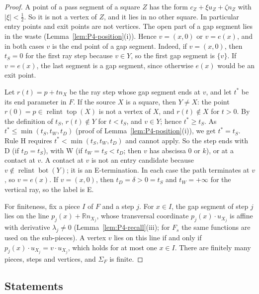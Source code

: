 \documentclass[11pt]{amsart}
\newcommand{\R}{\mathbb R}
\newcommand{\relint}{\operatorname{relint}}
\newcommand{\Bot}{\operatorname{bot}}
\newcommand{\Top}{\operatorname{top}}
\newcommand{\Fs}{F_{s}}
\theoremstyle{definition}
\theoremstyle{remark}
\numberwithin{equation}{section}
\begin{document}
\begin{proof}
A point of a pass segment of a square $Z$ has the form $c_Z+\xi u_Z+\zeta n_Z$ with $|\xi|<\frac12$. So it is not a vertex of $Z$, and it lies in no other square. In particular entry points and exit points are not vertices. The open part of a gap segment lies in the waste (Lemma~\ref{lem:P4-position}(i)). Hence $v=(x,0)$ or $v=e(x)$, and in both cases $v$ is the end point of a gap segment. Indeed, if $v=(x,0)$, then $t_S=0$ for the first ray step because $v\in Y$, so the first gap segment is $\{v\}$. If $v=e(x)$, the last segment is a gap segment, since otherwise $e(x)$ would be an exit point.

Let $r(t)=p+tn_X$ be the ray step whose gap segment ends at $v$, and let $t^*$ be its end parameter in $F$. If the source $X$ is a square, then $Y\ne X$: the point $r(0)=p\in\relint\Top(X)$ is not a vertex of $X$, and $r(t)\notin X$ for $t>0$. By the definition of $t_S$, $r(t)\notin Y$ for $t<t_S$, and $v\in Y$; hence $t^*\ge t_S$. As $t^*\le\min(t_S,t_W,t_D)$ (proof of Lemma~\ref{lem:P4-position}(i)), we get $t^*=t_S$. Rule H requires $t^*<\min(t_S,t_W,t_D)$ and cannot apply. So the step ends with D (if $t_D=t_S$), with W (if $t_W=t_S<t_D$; then $v$ has abscissa $0$ or $k$), or at a contact at $v$. A contact at $v$ is not an entry candidate because $v\notin\relint\Bot(Y)$; it is an E-termination. In each case the path terminates at $v$, so $v=e(x)$. If $v=(x,0)$, then $t_D=\delta>0=t_S$ and $t_W=+\infty$ for the vertical ray, so the label is E.

For finiteness, fix a piece $I$ of $F$ and a step $j$. For $x\in I$, the gap segment of step $j$ lies on the line $p_j(x)+\R n_{X_j}$, whose transversal coordinate $p_j(x)\cdot u_{X_j}$ is affine with derivative $\lambda_j\ne0$ (Lemma~\ref{lem:P4-recall}(iii); for $\Fs$ the same functions are used on the sub-pieces). A vertex $v$ lies on this line if and only if $p_j(x)\cdot u_{X_j}=v\cdot u_{X_j}$, which holds for at most one $x\in I$. There are finitely many pieces, steps and vertices, and $\Sigma_F$ is finite.
\end{proof}

\subsection{Statements}\label{ssec:P4-statements}
\end{document}
